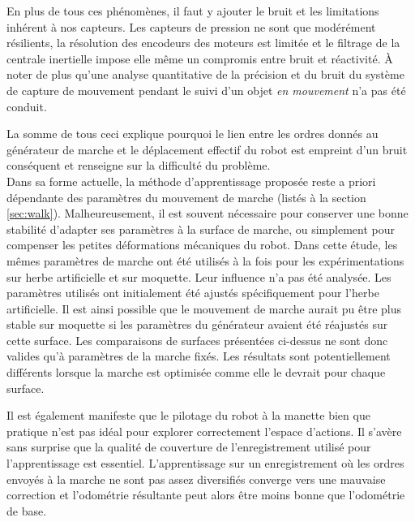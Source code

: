 En plus de tous ces phénomènes, il faut y ajouter le bruit et les 
limitations inhérent à nos capteurs.
Les capteurs de pression ne sont que modérément résilients, 
la résolution des encodeurs des moteurs est limitée et le filtrage
de la centrale inertielle impose elle même un compromis entre bruit et réactivité.
À noter de plus qu'une analyse quantitative de la précision et du bruit du système de
capture de mouvement pendant le suivi d'un objet \textit{en mouvement} 
n'a pas été conduit.

La somme de tous ceci explique pourquoi le lien entre les ordres donnés au générateur de marche
et le déplacement effectif du robot est empreint d'un bruit conséquent et renseigne sur
la difficulté du problème.\\

Dans sa forme actuelle, la méthode d'apprentissage proposée reste a priori dépendante des paramètres
du mouvement de marche (listés à la section \ref{sec:walk}).
Malheureusement, il est souvent nécessaire pour conserver une bonne stabilité d'adapter ses
paramètres à la surface de marche, ou simplement pour compenser les petites déformations
mécaniques du robot.
Dans cette étude, les mêmes paramètres de marche ont été utilisés à la fois pour
les expérimentations sur herbe artificielle et sur moquette. Leur influence n'a pas été analysée.
Les paramètres utilisés ont initialement été ajustés spécifiquement pour l'herbe artificielle.
Il est ainsi possible que le mouvement de marche aurait pu être plus stable sur moquette si 
les paramètres du générateur avaient été réajustés sur cette surface.
Les comparaisons de surfaces présentées ci-dessus ne sont donc valides qu'à 
paramètres de la marche fixés. 
Les résultats sont potentiellement différents lorsque la marche est \og optimisée \fg comme
elle le devrait pour chaque surface.

Il est également manifeste que le pilotage du robot à la manette bien que pratique 
n'est pas idéal pour explorer correctement l'espace d'actions.
Il s'avère sans surprise que la qualité de couverture de l'enregistrement utilisé 
pour l'apprentissage est essentiel. 
L'apprentissage sur un enregistrement où les ordres envoyés à la marche 
ne sont pas assez diversifiés converge vers une mauvaise correction et l'odométrie 
résultante peut alors être moins bonne que l'odométrie de base.

